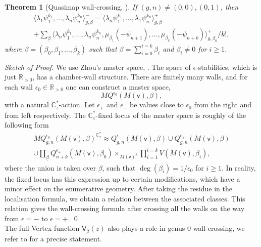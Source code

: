 \documentclass[11pt, reqno]{amsart}
\theoremstyle{plain}
\newtheorem{thm}{Theorem}[section]
\theoremstyle{definition}
\theoremstyle{remark}
\newcommand{\BC}{{\mathbb{C}}}
\newcommand{\BR}{{\mathbb{R}}}
\newcommand{\vsf}{{\mathsf{v}}}
\begin{document}
\begin{thm}[Quasimap wall-crossing,  \cite{N}]\label{thetheorem} If $(g,n)\neq (0,0) ,(0,1)$, then 
\begin{multline*}
\langle \lambda_1 \psi^{k_1}_1, \dots,\lambda_n \psi^{k_n}_n \rangle^{-}_{g,\beta} = \langle \lambda_n \psi^{k_1}_1, \dots,\lambda_1 \psi^{k_n}_n \rangle^{+}_{g,\beta} \\
+\sum_{\underline{\beta}} \langle \lambda_n \psi^{k_1}_1, \dots,\lambda_n \psi^{k_n}_n, \mu_{\beta_1}(-\psi_{n+1}), \dots, \mu_{\beta_k}(-\psi_{n+k}) \rangle^{+}_{g,\beta_0}/k!,
\end{multline*}
where $\underline{\beta}=(\beta_0, \beta_1, \dots, \beta_k)$ such that $\beta=\sum^{i=k}_{i=0}\beta_i$ and $\beta_i\neq 0$ for $i\geq 1$. 
	\end{thm}
\textit{Sketch of Proof.} We use Zhou's master space, \cite{YZ}. The space of $\epsilon$-stabilities, which is just $\BR_{>0}$, has a chamber-wall structure. There are finitely many walls,  and for each wall $\epsilon_0 \in \BR_{>0}$ one can construct a master space,
\[MQ^{\epsilon_0}(M(\vsf),\beta),\]
with a natural $\BC_z^*$-action. Let $\epsilon_+$ and $\epsilon_-$ be values close to $\epsilon_0$ from the right and from left respectively.   The $\BC_z^*$-fixed locus of the master space is roughly of the following form 
\begin{multline*}
 MQ_{g,n}^{\epsilon_0}(M(\vsf),\beta)^{\BC_z^*} \approx  Q_{g,n}^{\epsilon_-}(M(\vsf),\beta) \cup Q_{g,n}^{\epsilon_+ }(M(\vsf),\beta) \\ 
 \cup \coprod_{\underline{\beta}} Q_{n+k}^{\epsilon_+}(M(\vsf),\beta_0)\times_{M(\vsf)^k} \prod_{i=1}^{i=k}V(M(\vsf), \beta_i) ,
 \end{multline*}
where the union is taken over $\underline{\beta}$, such that $\deg(\beta_i)=1/\epsilon_0$ for $i\geq 1$. In reality, the fixed locus has this expression up to certain modifications, which have a minor effect on the enumerative geometry. After taking the residue  in the localisation formula, we obtain a relation between the associated classes. This relation gives the wall-crossing formula after crossing all the walls on the way from $\epsilon=-$ to $\epsilon=+$.
\qed
\\

The full Vertex function $\mathsf{V}_\beta(z)$ also plays a role in genus 0 wall-crossing, we refer to \cite[Theorem 6.6]{N} for a precise statement. 

	
\end{document}
